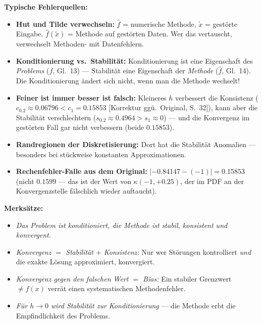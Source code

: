 \begin{merkbox}
\textbf{Typische Fehlerquellen:}
\begin{itemize}[nosep]
  \item \textbf{Hut und Tilde verwechseln:} $\hat{f}$ = numerische Methode, $\tilde{x}$ = gestörte Eingabe. $\hat{f}(\tilde{x})$ = Methode auf gestörten Daten. Wer das vertauscht, verwechselt Methoden- mit Datenfehlern.
  \item \textbf{Konditionierung vs.\ Stabilität:} Konditionierung ist eine Eigenschaft des \emph{Problems} ($f$, Gl.~13) — Stabilität eine Eigenschaft der \emph{Methode} ($\hat{f}$, Gl.~14). Die Konditionierung ändert sich nicht, wenn man die Methode wechselt!
  \item \textbf{\glqq Feiner ist immer besser\grqq{} ist falsch:} Kleineres $h$ verbessert die Konsistenz ($c_{0.2}\approx 0.06796 < c_1=0.15853$ [Korrektur ggü.\ Original, S.~32]), kann aber die Stabilität verschlechtern ($s_{0.2}\approx 0.4964 > s_1 \approx 0$) — und die Konvergenz im gestörten Fall gar nicht verbessern (beide $0.15853$).
  \item \textbf{Randregionen der Diskretisierung:} Dort hat die Stabilität Anomalien — besonders bei stückweise konstanten Approximationen.
  \item \textbf{Rechenfehler-Falle aus dem Original:} $|-0.84147-(-1)| = 0.15853$ (nicht $0.1599$ — das ist der Wert von $\kappa(-1,+0.25)$, der im PDF an der Konvergenzstelle fälschlich wieder auftaucht).
\end{itemize}
\textbf{Merksätze:}
\begin{itemize}[nosep]
  \item \emph{Das Problem ist konditioniert, die Methode ist stabil, konsistent und konvergent.}
  \item \emph{Konvergenz $=$ Stabilität $+$ Konsistenz:} Nur wer Störungen kontrolliert \emph{und} die exakte Lösung approximiert, konvergiert.
  \item \emph{Konvergenz gegen den falschen Wert $=$ Bias:} Ein stabiler Grenzwert $\neq f(x)$ verrät einen systematischen Methodenfehler.
  \item \emph{Für $h \to 0$ wird Stabilität zur Konditionierung} — die Methode erbt die Empfindlichkeit des Problems.
\end{itemize}
\end{merkbox}
